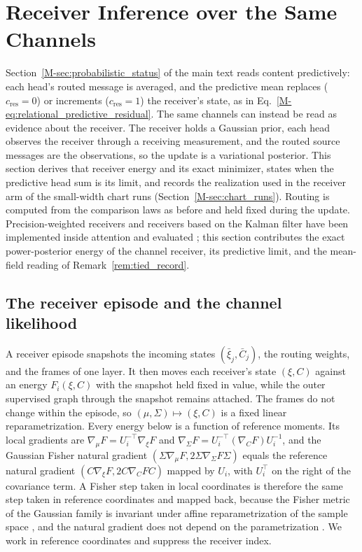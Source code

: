 \documentclass[twoside,11pt]{article}
\begin{document}
\section{Receiver Inference over the Same Channels}
\label{sec:receiver_inference}

Section~\ref{M-sec:probabilistic_status} of the main text reads content predictively: each head's routed message is averaged, and the predictive mean replaces ($c_{\mathrm{res}}=0$) or increments ($c_{\mathrm{res}}=1$) the receiver's state, as in Eq.~\eqref{M-eq:relational_predictive_residual}. The same channels can instead be read as evidence about the receiver. The receiver holds a Gaussian prior, each head observes the receiver through a receiving measurement, and the routed source messages are the observations, so the update is a variational posterior. This section derives that receiver energy and its exact minimizer, states when the predictive head sum is its limit, and records the realization used in the receiver arm of the small-width chart runs (Section~\ref{M-sec:chart_runs}). Routing is computed from the comparison laws as before and held fixed during the update. Precision-weighted receivers and receivers based on the Kalman filter \citep{Kalman1960} have been implemented inside attention and evaluated \citep{Racioppo2025RobustFilter,Shaj2026KalmanLinear,Long2026PrecisionTracked}; this section contributes the exact power-posterior energy of the channel receiver, its predictive limit, and the mean-field reading of Remark~\ref{rem:tied_record}.

\subsection{The receiver episode and the channel likelihood}
\label{sec:rec_channel}

A receiver episode snapshots the incoming states $(\bar\xi_j,\bar C_j)$, the routing weights, and the frames of one layer. It then moves each receiver's state $(\xi,C)$ against an energy $F_i(\xi,C)$ with the snapshot held fixed in value, while the outer supervised graph through the snapshot remains attached. The frames do not change within the episode, so $(\mu,\Sigma)\mapsto(\xi,C)$ is a fixed linear reparametrization. Every energy below is a function of reference moments. Its local gradients are $\nabla_\mu F=U_i^{-\top}\nabla_\xi F$ and $\nabla_\Sigma F=U_i^{-\top}(\nabla_CF)U_i^{-1}$, and the Gaussian Fisher natural gradient $(\Sigma\nabla_\mu F,2\Sigma\nabla_\Sigma F\Sigma)$ equals the reference natural gradient $(C\nabla_\xi F,2C\nabla_CFC)$ mapped by $U_i$, with $U_i^\top$ on the right of the covariance term. A Fisher step taken in local coordinates is therefore the same step taken in reference coordinates and mapped back, because the Fisher metric of the Gaussian family is invariant under affine reparametrization of the sample space \citep[Ch.~2]{Skovgaard1984,AmariNagaoka2000}, and the natural gradient does not depend on the parametrization \citep{Amari1998}. We work in reference coordinates and suppress the receiver index.
\end{document}
